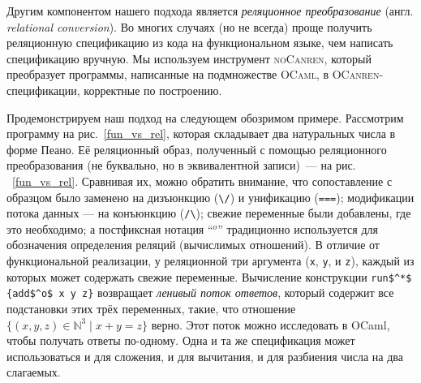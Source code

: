 Другим компонентом нашего подхода является \emph{реляционное преобразование} (англ. \emph{relational conversion}).
Во многих случаях (но не всегда) проще получить реляционную спецификацию из кода на функциональном языке, чем написать спецификацию вручную.
Мы используем инструмент \textsc{noCanren}, который преобразует программы, написанные на подмножестве \textsc{OCaml}, в  \textsc{OCanren}-спецификации, корректные по построению.


Продемонстрируем наш подход на следующем обозримом примере. Рассмотрим программу на рис.~\ref{fun_vs_rel}, которая складывает два натуральных числа в форме Пеано. Её реляционный образ, полученный с помощью реляционного преобразования (не буквально, но в эквивалентной записи)~--- на рис. ~\ref{fun_vs_rel}.
Сравнивая их, можно обратить внимание, что сопоставление с образцом было заменено на дизъюнкцию (\lstinline[language=ocanren,basicstyle=\small]|\/|)
и унификацию  (\lstinline[language=ocanren,basicstyle=\small]|===|); модификации потока данных --- на конъюнкцию (\lstinline[language=ocanren,basicstyle=\small]|/\|); свежие переменные были добавлены, где это необходимо; а постфиксная нотация ``$^o$'' традиционно используется для обозначения определения реляций (вычислимых отношений).
В отличие от функциональной реализации, у реляционной три аргумента (\lstinline[language=ocanren,basicstyle=\small]|x|, \lstinline[language=ocanren,basicstyle=\small]|y|,
и \lstinline[language=ocanren,basicstyle=\small]|z|), каждый из которых может содержать  свежие переменные.
Вычисление конструкции  \lstinline[language=ocanren,basicstyle=\small]|run$^*$ {add$^o$ x y z}| возвращает \emph{ленивый поток ответов}, который содержит все подстановки этих трёх переменных, такие, что отношение $\{(x,y,z)\in\mathbb{N}^3 \mid x+y=z\}$ верно.
Этот поток можно исследовать в OCaml, чтобы получать ответы по-одному. Одна и та же спецификация может использоваться и для сложения, и для вычитания, и для разбиения числа на два слагаемых.

